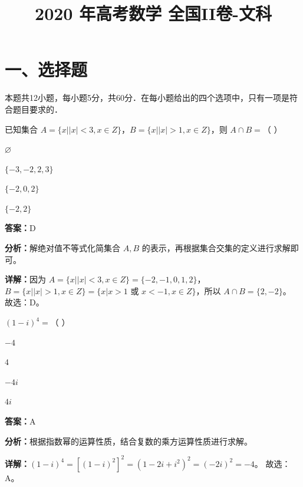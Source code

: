 ﻿\title{2020 年高考数学 全国II卷-文科}
\date{}
\maketitle

\section*{一、选择题}
本题共12小题，每小题5分，共60分．在每小题给出的四个选项中，只有一项是符合题目要求的．

\begin{question}[points=5]
已知集合 $A=\{x||x|<3, x \in Z\}$，$B=\{x||x|>1, x \in Z\}$，则 $A \cap B=$（ ）
\begin{choices}
  \item $\varnothing$
  \item $\{-3, -2, 2, 3\}$
  \item $\{-2, 0, 2\}$
  \item $\{-2, 2\}$
\end{choices}
\begin{solution}
\textbf{答案：}D

\textbf{分析：}解绝对值不等式化简集合 $A, B$ 的表示，再根据集合交集的定义进行求解即可。

\textbf{详解：}因为 $A=\{x||x|<3, x \in Z\}=\{-2, -1, 0, 1, 2\}$，$B=\{x||x|>1, x \in Z\}=\{x|x>1 \text{ 或 } x<-1, x \in Z\}$，所以 $A \cap B=\{2, -2\}$。
故选：D。
\end{solution}
\end{question}

\begin{question}[points=5]
$(1-i)^4 =$（ ）
\begin{choices}
  \item $-4$
  \item $4$
  \item $-4i$
  \item $4i$
\end{choices}
\begin{solution}
\textbf{答案：}A

\textbf{分析：}根据指数幂的运算性质，结合复数的乘方运算性质进行求解。

\textbf{详解：}$(1-i)^4 = [(1-i)^2]^2 = (1-2i+i^2)^2 = (-2i)^2 = -4$。
故选：A。
\end{solution}
\end{question}

